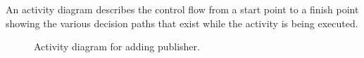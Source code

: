 
An activity diagram describes the control flow from a start point to a finish point showing the various decision paths that exist while the activity is being executed.


\begin{figure}[H]
\begin{center}	

	\caption{Activity diagram for adding publisher.}
	\label{dia_actvt_addpblshr}

\end{center}
\end{figure}

